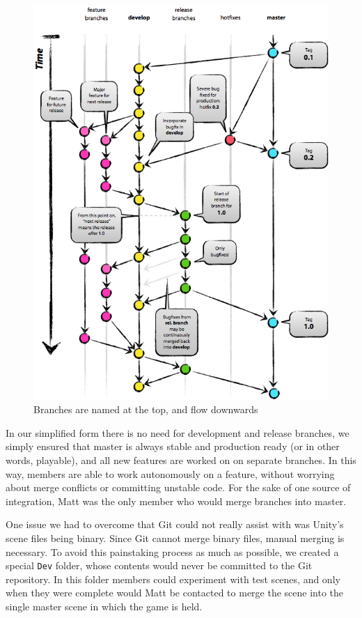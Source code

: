 \documentclass[a4paper,oneside]{memoir}
\begin{document}
			\begin{figure}[ht]
				\begin{center}
					\includegraphics[width=120mm]{../Screenshots/gitflow.png}
					\caption{Branches are named at the top, and flow downwards}
					\label{fig:GitFlow}
				\end{center}
			\end{figure}

			In our simplified form there is no need for development and release branches, we simply ensured that master is always stable and production ready (or in other words, playable), and all new features are worked on on separate branches.
			In this way, members are able to work autonomously on a feature, without worrying about merge conflicts or committing unstable code.
			For the sake of one source of integration, Matt was the only member who would merge branches into master.

			One issue we had to overcome that Git could not really assist with was Unity's scene files being binary.
			Since Git cannot merge binary files, manual merging is necessary.
			To avoid this painstaking process as much as possible, we created a special \texttt{Dev} folder, whose contents would never be committed to the Git repository.
			In this folder members could experiment with test scenes, and only when they were complete would Matt be contacted to merge the scene into the single master scene in which the game is held.
\end{document}
